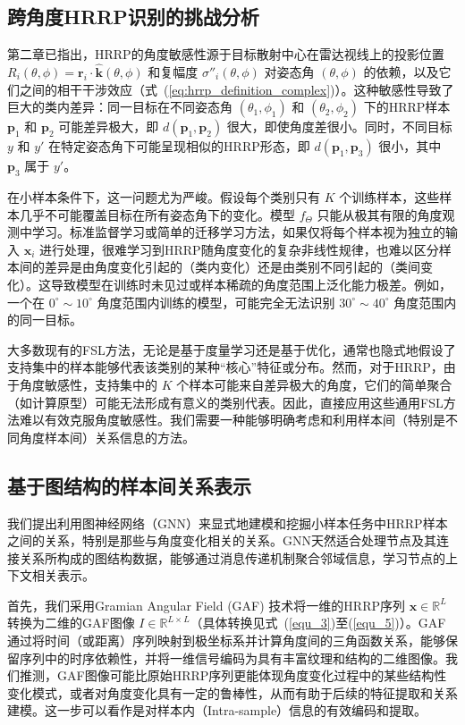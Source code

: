 \subsection{跨角度HRRP识别的挑战分析}
\label{subsec:angle_challenge_analysis}

第二章已指出，HRRP的角度敏感性源于目标散射中心在雷达视线上的投影位置 $R_i(\theta, \phi) = \mathbf{r}_i \cdot \hat{\mathbf{k}}(\theta, \phi)$ 和复幅度 $\sigma''_i(\theta, \phi)$ 对姿态角 $(\theta, \phi)$ 的依赖，以及它们之间的相干干涉效应（式~(\ref{eq:hrrp_definition_complex})）。这种敏感性导致了巨大的类内差异：同一目标在不同姿态角 $(\theta_1, \phi_1)$ 和 $(\theta_2, \phi_2)$ 下的HRRP样本 $\mathbf{p}_1$ 和 $\mathbf{p}_2$ 可能差异极大，即 $d(\mathbf{p}_1, \mathbf{p}_2)$ 很大，即使角度差很小。同时，不同目标 $y$ 和 $y'$ 在特定姿态角下可能呈现相似的HRRP形态，即 $d(\mathbf{p}_1, \mathbf{p}_3)$ 很小，其中 $\mathbf{p}_3$ 属于 $y'$。

在小样本条件下，这一问题尤为严峻。假设每个类别只有 $K$ 个训练样本，这些样本几乎不可能覆盖目标在所有姿态角下的变化。模型 $f_\Theta$ 只能从极其有限的角度观测中学习。标准监督学习或简单的迁移学习方法，如果仅将每个样本视为独立的输入 $\mathbf{x}_i$ 进行处理，很难学习到HRRP随角度变化的复杂非线性规律，也难以区分样本间的差异是由角度变化引起的（类内变化）还是由类别不同引起的（类间变化）。这导致模型在训练时未见过或样本稀疏的角度范围上泛化能力极差。例如，一个在 $0^\circ \sim 10^\circ$ 角度范围内训练的模型，可能完全无法识别 $30^\circ \sim 40^\circ$ 角度范围内的同一目标。

大多数现有的FSL方法，无论是基于度量学习还是基于优化，通常也隐式地假设了支持集中的样本能够代表该类别的某种“核心”特征或分布。然而，对于HRRP，由于角度敏感性，支持集中的 $K$ 个样本可能来自差异极大的角度，它们的简单聚合（如计算原型）可能无法形成有意义的类别代表。因此，直接应用这些通用FSL方法难以有效克服角度敏感性。我们需要一种能够明确考虑和利用样本间（特别是不同角度样本间）关系信息的方法。

\subsection{基于图结构的样本间关系表示}
\label{subsec:graph_relation_representation}

我们提出利用图神经网络（GNN）来显式地建模和挖掘小样本任务中HRRP样本之间的关系，特别是那些与角度变化相关的关系。GNN天然适合处理节点及其连接关系所构成的图结构数据，能够通过消息传递机制聚合邻域信息，学习节点的上下文相关表示。

首先，我们采用Gramian Angular Field (GAF) 技术将一维的HRRP序列 $\mathbf{x} \in \mathbb{R}^L$ 转换为二维的GAF图像 $I \in \mathbb{R}^{L \times L}$（具体转换见式~(\ref{equ_3})至(\ref{equ_5})）。GAF通过将时间（或距离）序列映射到极坐标系并计算角度间的三角函数关系，能够保留序列中的时序依赖性，并将一维信号编码为具有丰富纹理和结构的二维图像。我们推测，GAF图像可能比原始HRRP序列更能体现角度变化过程中的某些结构性变化模式，或者对角度变化具有一定的鲁棒性，从而有助于后续的特征提取和关系建模。这一步可以看作是对样本内（Intra-sample）信息的有效编码和提取。

